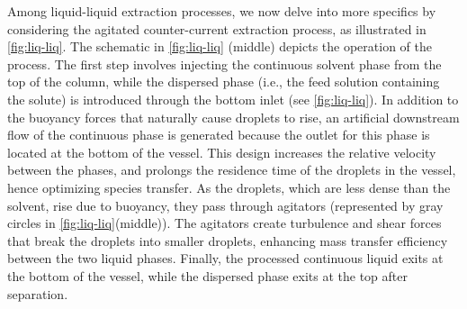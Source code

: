Among liquid-liquid extraction processes, we now delve into more specifics by considering the agitated counter-current extraction process, as illustrated in \ref{fig:liq-liq}. 
The schematic in \ref{fig:liq-liq} (middle) depicts the operation of the process.
The first step involves injecting the continuous solvent phase from the top of the column, while the dispersed phase (i.e., the feed solution containing the solute) is introduced through the bottom inlet (see \ref{fig:liq-liq}). 
In addition to the buoyancy forces that naturally cause droplets to rise, an artificial downstream flow of the continuous phase is generated because the outlet for this phase is located at the bottom of the vessel. 
This design increases the relative velocity between the phases, and prolongs the residence time of the droplets in the vessel, hence optimizing species transfer. 
As the droplets, which are less dense than the solvent, rise due to buoyancy, they pass through agitators (represented by gray circles in \ref{fig:liq-liq}(middle)). 
The agitators create turbulence and shear forces that break the droplets into smaller droplets, enhancing mass transfer efficiency between the two liquid phases. 
Finally, the processed continuous liquid exits at the bottom of the vessel, while the dispersed phase exits at the top after separation. 

